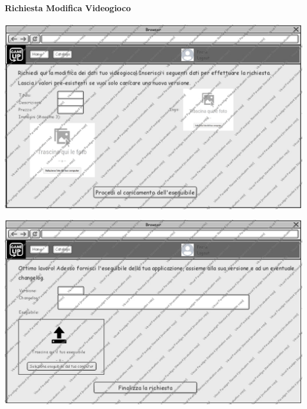 \paragraph{Richiesta Modifica Videogioco}
\begin{center}
\includegraphics[width=\textwidth,height=\textheight,keepaspectratio]{Figure/Mockups/RichiestaModificaVideogioco.jpg}
\end{center}

\newpage
\begin{center}
\includegraphics[width=\textwidth,height=\textheight,keepaspectratio]{Figure/Mockups/RichiestaPubblicazioneVideogioco2.jpg}
\end{center}

\newpage

